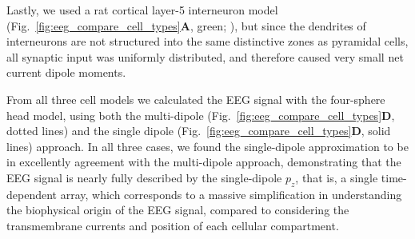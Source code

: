 \documentclass[preprint,10pt,authoryear]{elsarticle}
\newcommand{\hlb}[2][NavyBlue]{ {\sethlcolor{#1} \hl{#2}} }
\newcommand{\hlg}[2][Emerald]{ {\sethlcolor{#1} \hl{#2}} }
\newcommand{\snnote}[1]{\color{white}{\hlb{SN: #1 }}\color{black}}
\newcommand{\sntxt}[1]{{\color{NavyBlue}#1}}
\newcommand{\tvnnote}[1]{\color{white}{\hlg{TVN: #1 }}\color{black}}
\newcommand{\tvntxt}[1]{{\color{Emerald}#1}}
\begin{document}
Lastly, we used a rat cortical layer-5 interneuron model \tvntxt{(Fig.~\ref{fig:eeg_compare_cell_types}\textbf{A}, green; \cite{MARKRAM2015})}, but since the dendrites of interneurons are not structured into the same distinctive zones as pyramidal cells, all synaptic input was uniformly distributed, and therefore caused very small net current dipole moments.

\tvntxt{From all three cell models we calculated the EEG signal with the four-sphere head model, using both the multi-dipole (Fig.~\ref{fig:eeg_compare_cell_types}\textbf{D}, dotted lines) and the single dipole (Fig.~\ref{fig:eeg_compare_cell_types}\textbf{D}, solid lines) approach. In all three cases, we found the single-dipole approximation to be in excellently agreement with the multi-dipole approach, demonstrating that
}
the EEG signal is nearly fully described by the single-dipole $p_z$, that is, a single time-dependent array, which corresponds to a massive simplification in understanding the biophysical origin of the EEG signal, compared to considering the transmembrane currents and position of each cellular compartment. 


\end{document}
